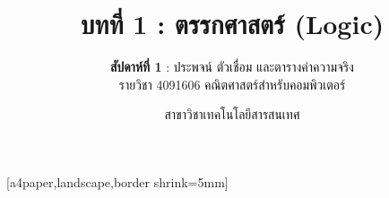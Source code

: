 \def\HANDOUTMODE{}

\usepackage{pgfpages}
[a4paper,landscape,border shrink=5mm]
\renewcommand{\footchaptertitle}{บทที่ 1 ตรรกศาสตร์ (สัปดาห์ที่ 1) — Handout}

\title{\textbf{บทที่ 1 : ตรรกศาสตร์ (Logic)}}
\subtitle{\textbf{สัปดาห์ที่ 1} : ประพจน์ ตัวเชื่อม และตารางค่าความจริง \\ รายวิชา 4091606 คณิตศาสตร์สำหรับคอมพิวเตอร์}
\author{สาขาวิชาเทคโนโลยีสารสนเทศ}
\date{}




